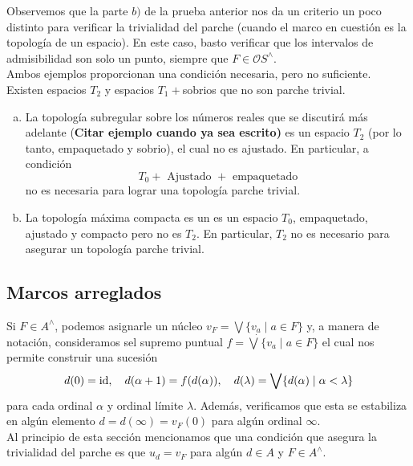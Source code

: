Observemos que la parte $b)$ de la prueba anterior nos da un criterio un poco distinto para verificar la trivialidad del parche (cuando el marco en cuestión es la topología de un espacio). En este caso, basto verificar que los intervalos de admisibilidad son solo un punto, siempre que $F\in \mathcal{O}S^\wedge$. \\

Ambos ejemplos proporcionan una condición necesaria, pero no suficiente. Existen espacios $T_2$ y espacios $T_1+$sobrios que no son parche trivial.



\begin{ej}\label{Ejemplo8.1.5}
    \begin{enumerate}[a)]
        \item La topología subregular sobre los números reales que se discutirá más adelante (\textbf{Citar ejemplo cuando ya sea escrito)} es un espacio $T_2$ (por lo tanto, empaquetado y sobrio), el cual no es ajustado. En particular, a condición
        \[
        T_0+\mbox{ Ajustado }+ \mbox{ empaquetado}
        \]
        no es necesaria para lograr una topología parche trivial.

        \item La topología máxima compacta es un es un espacio $T_0$, empaquetado, ajustado y compacto pero no es $T_2$. En particular, $T_2$ no es necesario para asegurar un topología parche trivial.
    \end{enumerate}
\end{ej}

\subsection{Marcos arreglados}

Si $F\in A^\wedge$, podemos asignarle un núcleo $v_F=\bigvee \{v_a\mid a\in F\}$ y, a manera de notación, consideramos sel supremo puntual $f=\dot{\bigvee}\{v_a\mid a\in F\}$ el cual nos permite construir una sucesión 
\[
d(0)=\mathrm{id}, \quad d(\alpha +1)=f(d(\alpha)),\quad d(\lambda)=\bigvee\{d(\alpha)\mid \alpha <\lambda\}
\]
para cada ordinal $\alpha$ y ordinal límite $\lambda$. Además, verificamos que esta se estabiliza en algún elemento $d=d(\infty)=v_F(0)$ para algún ordinal $\infty$.\\

Al principio de esta sección mencionamos que una condición que asegura la trivialidad del parche es que $u_d=v_F$ para algún $d\in A$ y $F\in A^\wedge$.\\

